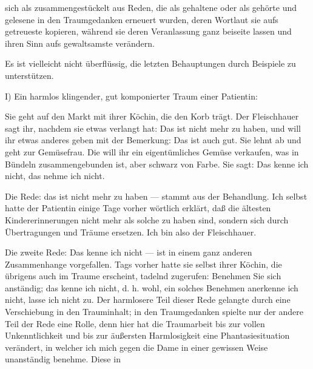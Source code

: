 \documentclass[twoside=true,titlepage=false,open=any, parskip=never, fontsize=10pt, headings=small, chapterprefix=false, appendixprefix=false]{scrbook}
\begin{document}
         
            
            
            
        \pstart
        sich als zusammengestückelt aus Reden, die als gehaltene oder als
               gehörte und gelesene in den Traumgedanken erneuert wurden, deren Wortlaut sie
               aufs getreueste kopieren, während sie deren Veranlassung ganz beiseite lassen
               und ihren Sinn aufs gewaltsamste verändern.
        \pend
    
            
        \pstart
        Es ist vielleicht nicht überflüssig, die letzten Behauptungen durch Beispiele zu
               unterstützen.
        \pend
    
            
        \pstart
        I) Ein harmlos klingender, gut komponierter Traum einer
               Patientin:
        \pend
    
            
        \pstart
        Sie geht auf den Markt mit ihrer Köchin, die den Korb trägt. Der
                  Fleischhauer sagt ihr, nachdem sie etwas verlangt hat: Das ist nicht mehr zu
                  haben, und will ihr etwas anderes geben mit der Bemerkung: Das ist auch gut. Sie
                  lehnt ab und geht zur Gemüsefrau. Die will ihr ein eigentümliches Gemüse
                  verkaufen, was in Bündeln zusammengebunden ist, aber schwarz von Farbe. Sie sagt:
                  Das kenne ich nicht, das nehme ich nicht.
        \pend
    
            
        \pstart
        Die Rede: das ist nicht mehr zu haben — stammt aus der Behandlung. Ich selbst
               hatte der Patientin einige Tage vorher wörtlich erklärt, daß die ältesten
               Kindererinnerungen nicht mehr als solche zu haben sind, sondern sich durch Übertragungen und Träume ersetzen. Ich bin also der Fleischhauer.
        \pend
    
            
        \pstart
        Die zweite Rede: Das kenne ich nicht — ist in
               einem ganz anderen Zusammenhange vorgefallen. Tags vorher hatte sie selbst
               ihrer Köchin, die übrigens auch im Traume erscheint, tadelnd zugerufen: Benehmen Sie sich anständig; das kenne ich nicht, d.
               h. wohl, ein solches Benehmen anerkenne ich nicht, lasse ich nicht zu. Der
               harmlosere Teil dieser Rede gelangte durch eine Verschiebung in den Trauminhalt;
               in den Traumgedanken spielte nur der andere Teil der Rede eine Rolle, denn
               hier hat die Traumarbeit bis zur vollen Unkenntlichkeit und bis zur äußersten
               Harmlosigkeit eine Phantasiesituation verändert, in welcher ich mich
               gegen die Dame in einer gewissen Weise unanständig
                  benehme. Diese in
        \pend
    
\end{document}
